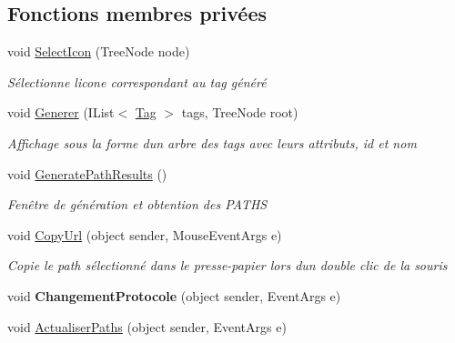 \subsection*{Fonctions membres privées}
\begin{DoxyCompactItemize}
\item 
void \mbox{\hyperlink{class_m_t_connect_agent_1_1_user_control_display_tab_aea40e1e7daf5f6821fc4b6c7dc717563}{Select\+Icon}} (Tree\+Node node)
\begin{DoxyCompactList}\small\item\em Sélectionne l\textquotesingle{}icone correspondant au tag généré \end{DoxyCompactList}\item 
void \mbox{\hyperlink{class_m_t_connect_agent_1_1_user_control_display_tab_a936a17ca9a88c0cbab0e70894567cdad}{Generer}} (I\+List$<$ \mbox{\hyperlink{class_m_t_connect_agent_1_1_model_1_1_tag}{Tag}} $>$ tags, Tree\+Node root)
\begin{DoxyCompactList}\small\item\em Affichage sous la forme d\textquotesingle{}un arbre des tags avec leurs attributs, id et nom \end{DoxyCompactList}\item 
void \mbox{\hyperlink{class_m_t_connect_agent_1_1_user_control_display_tab_a8007de48e5b3c138c3260fa361f744c0}{Generate\+Path\+Results}} ()
\begin{DoxyCompactList}\small\item\em Fenêtre de génération et obtention des P\+A\+T\+HS \end{DoxyCompactList}\item 
void \mbox{\hyperlink{class_m_t_connect_agent_1_1_user_control_display_tab_ac246a46fbe6cab71326ea2a6e6ade5cd}{Copy\+Url}} (object sender, Mouse\+Event\+Args e)
\begin{DoxyCompactList}\small\item\em Copie le path sélectionné dans le presse-\/papier lors d\textquotesingle{}un double clic de la souris \end{DoxyCompactList}\item 
\mbox{\label{class_m_t_connect_agent_1_1_user_control_display_tab_ae279107d6601b7bc7b28a44dcbc68e5e}} 
void {\bfseries Changement\+Protocole} (object sender, Event\+Args e)
\item 
void \mbox{\hyperlink{class_m_t_connect_agent_1_1_user_control_display_tab_a2f29e407545f62944defd9533dc895e0}{Actualiser\+Paths}} (object sender, Event\+Args e)

\end{DoxyCompactItemize}
